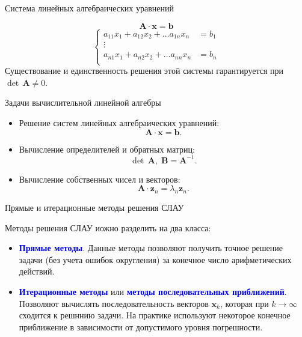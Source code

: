\documentclass[10pt,xcolor=pst,aspectratio=169]{beamer}
\begin{document}
\begin{frame}{Система линейных алгебраических уравнений}

	\transdissolve[duration=0.2]
	\justifying
	\large
	\begin{equation}
		\textbf{A} \cdot \textbf{x} = \textbf{b}
		\label{eqn:SLAE_VEC}
	\end{equation}
	\begin{equation}
		\begin{cases}
			a_{1 1} x_{1} + a_{1 2} x_{2} + \ldots a_{1 n} x_{n} & = b_{1} \\
			\vdots \\
			a_{n 1} x_{1} + a_{n 2} x_{2} + \ldots a_{n n} x_{n} & = b_{n} \\
		\end{cases}
		\label{eqn:SLAE_SCAL}
	\end{equation}
	Существование и единственность решения этой системы гарантируется при $\det \, \textbf{A} \neq 0$.

\end{frame}

\begin{frame}{Задачи вычислительной линейной алгебры}

	\transdissolve[duration=0.2]
	\justifying
	\large
	\pause
	\begin{itemize}
	\item Решение систем линейных алгебраических уравнений:
		\[
			\textbf{A} \cdot \textbf{x} = \textbf{b} .
		\] \pause
	\item Вычисление определителей и обратных матриц:
		\[
			\det \, \textbf{A}, \; \textbf{B} = \textbf{A}^{-1} .
		\] \pause
	\item Вычисление собственных чисел и векторов:
		\[
			\textbf{A} \cdot \textbf{z}_{n} = \lambda_{n} \textbf{z}_{n} .
		\]
	\end{itemize}

\end{frame}

\begin{frame}{Прямые и итерационные методы решения СЛАУ}

	\transdissolve[duration=0.2]
	\justifying
	Методы решения СЛАУ иожно разделить на два класса: \pause
	\begin{itemize} \justifying
		\item \textbf{\textcolor{blue}{Прямые методы}}. Данные методы позволяют получить точное решение задачи (без учета ошибок округления) за конечное число арифметических действий. \pause
		\item \textbf{\textcolor{blue}{Итерационные методы}} или \textbf{\textcolor{blue}{методы последовательных приближений}}. Позволяют вычислять последовательность векторов $\textbf{x}_{k}$, которая при $k \rightarrow \infty$ сходится к решннию задачи. На практике используют некоторое конечное приближение в зависимости от допустимого уровня погрешности.
	\end{itemize}

\end{frame}
\end{document}
